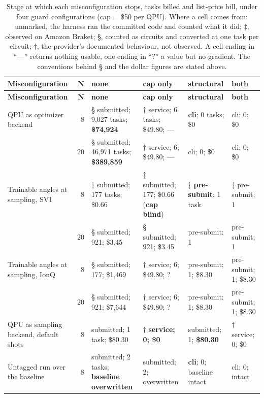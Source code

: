 \documentclass[acmsmall,screen,review]{acmart}
\begin{document}
\begingroup
\small
\setlength\LTleft{\fill}
\setlength\LTright{\fill}
\begin{xltabular}{\textwidth}{>{\hsize}Yr>{\hsize}Y>{\hsize}Y>{\hsize}Y>{\hsize}Y}
\caption{Stage at which each misconfiguration stops, tasks billed and list-price bill, under four guard configurations (cap = \$50 per QPU). Where a cell comes from: unmarked, the harness ran the committed code and counted what it did; $\ddagger$, observed on Amazon Braket; \S{}, counted as circuits and converted at one task per circuit; $\dagger$, the provider's documented behaviour, not observed. A cell ending in ``---'' returns nothing usable, one ending in ``?'' a value but no gradient. The conventions behind \S{} and the dollar figures are stated above.}\label{tab:8} \\
\toprule
\textbf{Misconfiguration} & \textbf{N} & \textbf{none} & \textbf{cap only} & \textbf{structural} & \textbf{both} \\
\midrule
\endfirsthead
\toprule
\textbf{Misconfiguration} & \textbf{N} & \textbf{none} & \textbf{cap only} & \textbf{structural} & \textbf{both} \\
\midrule
\endhead
\endfoot
\bottomrule
\endlastfoot
QPU as optimizer backend & 8 & \S{} submitted; 9,027 tasks; \textbf{\$74,924} & $\dagger$ service; 6 tasks; \$49.80; --- & \textbf{cli}; 0 tasks; \$0 & cli; 0; \$0 \\
 & 20 & \S{} submitted; 46,971 tasks; \textbf{\$389,859} & $\dagger$ service; 6; \$49.80; --- & cli; 0; \$0 & cli; 0; \$0 \\
Trainable angles at sampling, SV1 & 8 & $\ddagger$ submitted; 177 tasks; \$0.66 & $\ddagger$ submitted; 177; \$0.66 (\textbf{cap blind}) & $\ddagger$ \textbf{pre-submit}; 1 task & $\ddagger$ pre-submit; 1 \\
 & 20 & \S{} submitted; 921; \$3.45 & \S{} submitted; 921; \$3.45 & pre-submit; 1 & pre-submit; 1 \\
Trainable angles at sampling, IonQ & 8 & \S{} submitted; 177; \$1,469 & $\dagger$ service; 6; \$49.80; ? & pre-submit; 1; \$8.30 & pre-submit; 1; \$8.30 \\
 & 20 & \S{} submitted; 921; \$7,644 & $\dagger$ service; 6; \$49.80; ? & pre-submit; 1; \$8.30 & pre-submit; 1; \$8.30 \\
QPU as sampling backend, default shots & 8 & submitted; 1 task; \$80.30 & $\dagger$ \textbf{service; 0; \$0} & submitted; 1; \textbf{\$80.30} & $\dagger$ service; 0; \$0 \\
Untagged run over the baseline & 8 & submitted; 2 tasks; \textbf{baseline overwritten} & submitted; 2; overwritten & \textbf{cli}; 0; baseline intact & cli; 0; intact \\
\end{xltabular}
\endgroup
\end{document}

